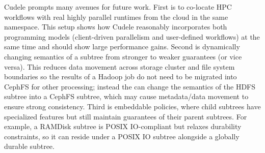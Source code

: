 Cudele prompts many avenues for future work.  First is to co-locate HPC
workflows with real highly parallel runtimes from the cloud in the same
namespace. This setup shows how Cudele reasonably incorporates both programming
models (client-driven parallelism and user-defined workflows) at the same time
and should show large performance gains.  Second is dynamically changing
semantics of a subtree from stronger to weaker guarantees (or vice versa). This
reduces data movement across storage cluster and file system boundaries so
the results of a Hadoop job do not need to be migrated into CephFS for
other processing; instead the  can
change the semantics of the HDFS subtree into a CephFS subtree, which may cause
metadata/data movement to ensure strong consistency. Third is embeddable
policies, where child subtrees have specialized features but still maintain
guarantees of their parent subtrees.  For example, a RAMDisk subtree is POSIX
IO-compliant but relaxes durability constraints, so it can reside under a POSIX
IO subtree alongside a globally durable subtree.









